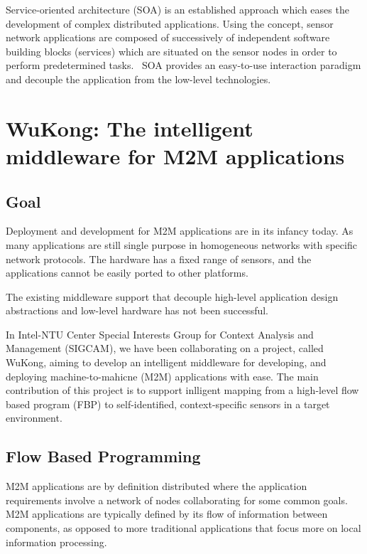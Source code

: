Service-oriented architecture (SOA) is an established approach which eases the
development of complex distributed applications. Using the concept, sensor
network applications are composed of successively of independent software
building blocks (services) which are situated on the sensor nodes in order to
perform predetermined tasks.~\cite{Neumann2010, Marin-Perianu2007} SOA provides
an easy-to-use interaction paradigm and decouple the application from the
low-level technologies.

\section{WuKong: The intelligent middleware for M2M applications}

\subsection{Goal}

Deployment and development for M2M applications are in its infancy today. As
many applications are still single purpose in homogeneous networks with
specific network protocols. The hardware has a fixed range of sensors, and the
applications cannot be easily ported to other platforms.

The existing middleware support that decouple high-level application design
abstractions and low-level hardware has not been successful.

In Intel-NTU Center Special Interests Group for Context Analysis and Management 
(SIGCAM), we have been collaborating on a project, called WuKong, aiming to develop 
an intelligent middleware for developing, and deploying machine-to-mahicne 
(M2M) applications with ease. The main contribution of this project is to support
inlligent mapping from a high-level flow based program (FBP) to
self-identified, context-specific sensors in a target
environment\cite{Reijers}.

\subsection{Flow Based Programming}

M2M applications are by definition distributed where the application
requirements involve a network of nodes collaborating for some common 
goals. M2M applications are typically defined by its flow of information
between components, as opposed to more traditional applications that focus more
on local information processing.

